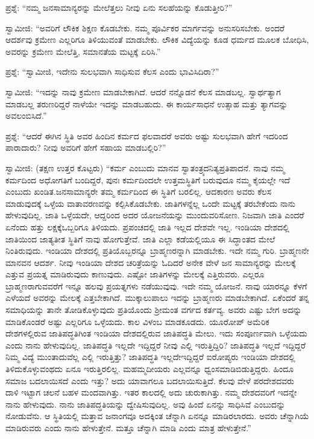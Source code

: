 ಪ್ರಶ್ನೆ: “ನಮ್ಮ ಜನಸಾಮಾನ್ಯರನ್ನು ಮೇಲೆತ್ತಲು ನೀವು ಏನು ಸಲಹೆಯನ್ನು ಕೊಡುತ್ತೀರಿ?”

ಸ್ವಾಮೀಜಿ: “ಅವರಿಗೆ ಲೌಕಿಕ ಶಿಕ್ಷಣ ಕೊಡಬೇಕು. ನಮ್ಮ ಪೂರ್ವಿಕರ ಮಾರ್ಗವನ್ನು ಅನುಸರಿಸಬೇಕು. ಅಂದರೆ ಆದರ್ಶವು ಕ್ರಮೇಣ ಎಲ್ಲರಿಗೂ ತಿಳಿಯುವಂತೆ ಮಾಡಬೇಕು. ಲೌಕಿಕ ವಿದ್ಯೆಯನ್ನು ಕೂಡ ಧರ್ಮದ ಮೂಲಕ ಬೋಧಿಸಿ, ಅವರನ್ನು ಕ್ರಮೇಣ ಮೇಲೆತ್ತಿ, ಸಮಾನತೆಯ ಮಟ್ಟಕ್ಕೆ ಏರಿಸಿ.”

ಪ್ರಶ್ನೆ: “ಸ್ವಾಮೀಜಿ, ಇದೇನು ಸುಲಭವಾಗಿ ಸಾಧಿಸುವ ಕೆಲಸ ಎಂದು ಭಾವಿಸಿದಿರಾ?”

ಸ್ವಾಮೀಜಿ: “ಇದನ್ನು ನಾವು ಕ್ರಮೇಣ ಮಾಡಬೇಕಾಗಿದೆ. ಆದರೆ ನನ್ನೊಡನೆ ಕೆಲಸ ಮಾಡಬಲ್ಲ. ಸ್ವಾರ್ಥತ್ಯಾಗ ಮಾಡಬಲ್ಲ ತರುಣರಿದ್ದರೆ ನಾಳೆಯೇ ಇದನ್ನು ಮಾಡಬಹುದು. ಈ ಕಾರ್ಯಸಾಧನೆ ಉತ್ಸಾಹ ಮತ್ತು ತ್ಯಾಗವನ್ನು ಅವಲಂಬಿಸಿದೆ.”

ಪ್ರಶ್ನೆ: “ಆದರೆ ಈಗಿನ ಸ್ಥಿತಿ ಅವರ ಹಿಂದಿನ ಕರ್ಮದ ಫಲವಾದರೆ ಅವರು ಅಷ್ಟು ಸುಲಭವಾಗಿ ಹೇಗೆ ಇದರಿಂದ ಪಾರಾದಾರು? ನೀವು ಅವರಿಗೆ ಹೇಗೆ ಸಹಾಯ ಮಾಡಬಲ್ಲಿರಿ?”

ಸ್ವಾಮೀಜಿ: (ತಕ್ಷಣ ಉತ್ತರ ಕೊಟ್ಟರು) “ಕರ್ಮ ಎಂಬುದು ಮಾನವ ಸ್ವಾತಂತ್ರ್ಯದ\break ನಿತ್ಯಪ್ರತಿಪಾದನೆ. ನಾವು ನಮ್ಮ ಕರ್ಮದಿಂದ ಅಧೋಗತಿಗೆ ಬಂದಿದ್ದರೆ, ಪುನಃ ಕರ್ಮದಿಂದಲೇ ಉತ್ತಮಸ್ಥಿತಿಗೆ ಬರುವುದೂ ನಮ್ಮ ಕೈಯಲ್ಲೇ ಇದೆ ಎಂಬುದು ಖಂಡಿತ.\break ಜನಸಾಮಾನ್ಯರೇ ತಮ್ಮ ಕರ್ಮದಿಂದ ಈ ಸ್ಥಿತಿಗೆ ಬರಲಿಲ್ಲ. ಆದಕಾರಣ ಅವರು ಕೆಲಸ ಮಾಡುವುದಕ್ಕೆ ಒಳ್ಳೆಯ ವಾತಾವರಣವನ್ನು ಕಲ್ಪಿಸಿಕೊಡಬೇಕು. ಜಾತಿಗಳನ್ನೆಲ್ಲ ಒಂದೇ ಮಟ್ಟಕ್ಕೆ ತರಬೇಕೆಂದು ನಾನು ಹೇಳುವುದಿಲ್ಲ. ಜಾತಿ ಒಳ್ಳೆಯದೇ, ಆದ್ದರಿಂದ ಅದರ ಯೋಜನೆಯನ್ನು ಮುಂದುವರಿಸೋಣ. ನಿಜವಾಗಿ ಜಾತಿ ಎಂದರೆ ಏನೆಂದು ಹತ್ತು ಲಕ್ಷಕ್ಕೆ\break ಒಬ್ಬರಿಗೂ ತಿಳಿಯದು. ಪ್ರಪಂಚದಲ್ಲಿ ಜಾತಿ ಇಲ್ಲದ ದೇಶವೇ ಇಲ್ಲ. ಇಂಡಿಯಾ ದೇಶದಲ್ಲಿ ಜಾತಿಯಿಂದ ಜಾತ್ಯತೀತ ಸ್ಥಿತಿಗೆ ನಾವು ಹೋಗುತ್ತೇವೆ. ಜಾತಿ ಎಲ್ಲಾ ಕಡೆಯಲ್ಲಿಯೂ ಈ ಸಿದ್ಧಾಂತದ ಮೇಲೆ ನಿಂತಿರುವುದು. ಇಂಡಿಯಾ ದೇಶದಲ್ಲಿ ಪ್ರತಿಯೊಬ್ಬರನ್ನೂ ಬ್ರಾಹ್ಮಣ\-ರನ್ನಾಗಿ ಮಾಡಬೇಕು. ಇದೇ ನಮ್ಮ ಗುರಿ. ಬ್ರಾಹ್ಮಣನೇ ಮಾನವನ ಆದರ್ಶ. ನೀವು ಇಂಡಿಯಾ ದೇಶದ ಚರಿತ್ರೆಯನ್ನು ಓದಿದರೆ ಅನೇಕ ವೇಳೆ ಜನ ಸಾಮಾನ್ಯರನ್ನು ಮೇಲಕ್ಕೆ ಎತ್ತುವ ಪ್ರಯತ್ನ ಮಾಡಿರುವುದು ಕಾಣುವುದು. ಎಷ್ಟೋ ಜಾತಿಗಳನ್ನು ಮೇಲಕ್ಕೆ ಎತ್ತಿರುವರು. ಎಲ್ಲರೂ ಬ್ರಾಹ್ಮಣರಾಗುವವರೆಗೆ ಇನ್ನೂ ಹಲವು ಪ್ರಯತ್ನಗಳು ನಡೆಯುವುವು. ಇದೇ ನಮ್ಮ ಯೋಜನೆ. ನಾವು ಯಾರನ್ನೂ ಕೆಳಗೆ ಎಳೆಯದೆ ಅವರನ್ನು ಮೇಲಕ್ಕೆ ಎತ್ತಬೇಕಾಗಿದೆ. ಮುಕ್ಕಾಲುಪಾಲು ಇದನ್ನು ಬ್ರಾಹ್ಮಣರು ಮಾಡಬೇಕಾಗಿದೆ. ಏಕೆಂದರೆ ತನ್ನ ಸಮಾಧಿಯನ್ನು ತಾನೇ ತೋಡಿಕೊಳ್ಳುವುದು ಪ್ರತಿಯೊಂದು ಶ‍್ರೀಮಂತ ವರ್ಗದ ಕರ್ತವ್ಯ. ಅವರು ಎಷ್ಟು ಬೇಗ ಅದನ್ನು ಮಾಡಿಕೊಂಡರೆ ಅಷ್ಟು ಎಲ್ಲರಿಗೂ ಒಳ್ಳೆಯದು. ಕಾಲ ವಿಳಂಬ ಮಾಡಕೂಡದು. ಯೂರೋಪ್​ ಅಮೆರಿಕ ದೇಶಗಳಲ್ಲಿರುವ ಜಾತಿಪದ್ಧತಿಗಿಂತ ಇಂಡಿಯಾ ದೇಶದಲ್ಲಿರುವ ಜಾತಿಪದ್ಧತಿ ಮೇಲು. ಇದು ಸಂಪೂರ್ಣವಾಗಿ ಒಳ್ಳೆಯದು ಎಂದು ನಾನು ಹೇಳುವುದಿಲ್ಲ. ಜಾತಿಪದ್ಧತಿ ಇಲ್ಲದೇ ಇದ್ದಿದ್ದರೆ ನೀವು ಎಲ್ಲಿ ಇರುತ್ತಿದ್ದಿರಿ? ಜಾತಿಪದ್ಧತಿ ಇಲ್ಲದೆ ಇದ್ದಿದ್ದರೆ ನಿಮ್ಮ ವಿದ್ಯೆ ಮುಂತಾದುವೆಲ್ಲ ಎಲ್ಲಿ ಇರುತ್ತಿತ್ತು? ಜಾತಿಪದ್ಧತಿ ಇಲ್ಲದೇ\break ಇದ್ದಿದ್ದರೆ ಐರೋಪ್ಯರು ಇಂಡಿಯಾ ದೇಶದಲ್ಲಿ ತಿಳಿದುಕೊಳ್ಳುವಂಥದು ಏನೂ ಇರುತ್ತಿರಲಿಲ್ಲ. ಮಹಮ್ಮದೀಯರು ಎಲ್ಲವನ್ನೂ ಧ್ವಂಸಮಾಡಿಬಿಡುತ್ತಿದ್ದರು. ಹಿಂದೂ ಸಮಾಜ ಬದಲಾಯಿಸದೆ ಎಂದು ಇತ್ತು? ಅದು ಯಾವಾಗಲೂ ಬದಲಾಯಿಸುತ್ತಿದೆ. ಕೆಲವು ವೇಳೆ ಪರದೇಶದವರು ದಾಳಿ ಇಟ್ಟಾಗ ಚಲನೆ ಬಹಳ ಮಂದವಾಗಿತ್ತು. ಇತರ ಕಾಲದಲ್ಲಿ ಅದು ಚುರುಕಾಗಿತ್ತು. ನಮ್ಮ ದೇಶದವರಿಗೆ ಇದನ್ನೇ ನಾನು ಹೇಳುವುದು. ನಾನು ಜಾತಿಪದ್ಧತಿಯನ್ನು ದ್ವೇಷಿಸುವುದಿಲ್ಲ. ಅವು ಹಿಂದೆ ಏನನ್ನು ಸಾಧಿಸಿವೆ ಎಂಬುದನ್ನು ನೋಡುವೆನು. ಆ ಸ್ಥಿತಿಯಲ್ಲಿ ಮತ್ತಾವ ಜನಾಂಗವೂ ಅದಕ್ಕಿಂತ ಚೆನ್ನಾಗಿ ಏನನ್ನೂ ಮಾಡಿರಲಾರದು. ಅವರು ಚೆನ್ನಾಗಿಯೆ ಮಾಡಿರುವರು ಎಂದು ನಾನು ಹೇಳುತ್ತೇನೆ. ಮತ್ತೂ ಚೆನ್ನಾಗಿ ಮಾಡಿ ಎಂದು ಮಾತ್ರ ಹೇಳುತ್ತೇನೆ.”

